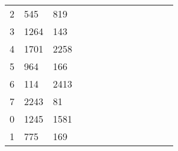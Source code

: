 \begin{table}[tb]
\begin{tabular}{|l|l|l|llllllllll}
		2 & 545  & 819  &                           &                          &                          &                          &                           &                          &                           &                           &                           &                           \\ \cline{1-3}
		3 & 1264 & 143  &                           &                          &                          &                          &                           &                          &                           &                           &                           &                           \\ \cline{1-3}
		4 & 1701 & 2258 &                           &                          &                          &                          &                           &                          &                           &                           &                           &                           \\ \cline{1-3}
		5 & 964  & 166  &                           &                          &                          &                          &                           &                          &                           &                           &                           &                           \\ \cline{1-3}
		6 & 114  & 2413 &                           &                          &                          &                          &                           &                          &                           &                           &                           &                           \\ \cline{1-3}
		7 & 2243 & 81   &                           &                          &                          &                          &                           &                          &                           &                           &                           &                           \\ \cline{1-3}
		0 & 1245 & 1581 &                           &                          &                          &                          &                           &                          &                           &                           &                           &                           \\ \cline{1-3}
		1 & 775  & 169  &                           &                          &                          &                          &                           &                          &                           &                           &                           &                           \\ \cline{1-3}

\end{tabular}
\end{table}
